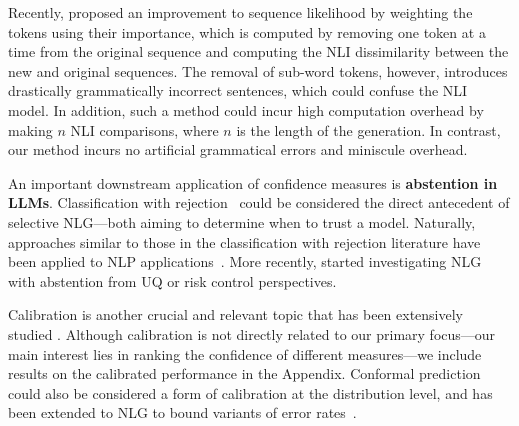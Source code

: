 Recently, \citet{duan2023shifting} proposed an improvement to sequence likelihood by weighting the tokens using their importance, which is computed by removing one token at a time from the original sequence and computing the NLI dissimilarity between the new and original sequences.
The removal of sub-word tokens, however, introduces drastically grammatically incorrect sentences, which could confuse the NLI model.
In addition, such a method could incur high computation overhead by making $n$ NLI comparisons, where $n$ is the length of the generation. 
In contrast, our method incurs no artificial grammatical errors and miniscule overhead. 

An important downstream application of confidence measures is \textbf{abstention in LLMs}.
Classification with rejection~\cite{Corbiere2019AddressingConfidence,Fumera2000RejectThresholds,Geifman2017SelectiveNetworks,Jiang2018ToClassifier,lin2022scrib} could be considered the direct antecedent of selective NLG---both aiming to determine when to trust a model. %
Naturally, approaches similar to those in the classification with rejection literature have been applied to NLP applications~\cite{varshney-etal-2022-investigating,varshney-etal-2022-towards}.
More recently, \citet{cole2023selectively,yadkori2024mitigating,lin2023generating,quach2023conformal} started investigating NLG with abstention from UQ or risk control perspectives.


Calibration is another crucial and relevant topic that has been extensively studied \cite{mielke-etal-2022-reducing,si-etal-2022-examining,xiong2023llms,zhu2023on}.
Although calibration is not directly related to our primary focus---our main interest lies in ranking the confidence of different measures---we include results on the calibrated performance in the Appendix.
Conformal prediction~\cite{vovk2005algorithmic} could also be considered a form of calibration at the distribution level, and has been extended to NLG to bound variants of error rates~\cite{quach2023conformal,yadkori2024mitigating}.

